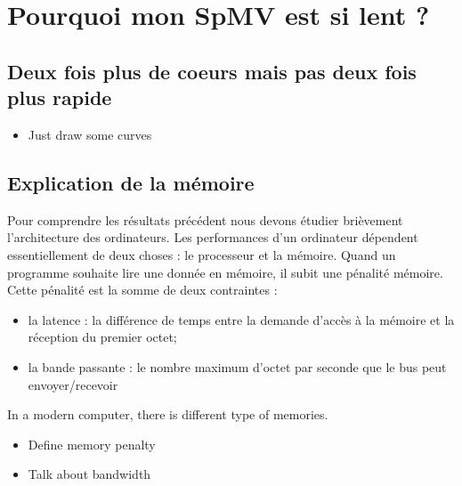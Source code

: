\section{Pourquoi mon SpMV est si lent ?}
\subsection{Deux fois plus de coeurs mais pas deux fois plus rapide}
  \begin{itemize}
    \item Just draw some curves
  \end{itemize}
\subsection{Explication de la mémoire}
Pour comprendre les résultats précédent nous devons étudier brièvement l'architecture des ordinateurs.
%
Les performances d'un ordinateur dépendent essentiellement de deux choses : le processeur et la mémoire.
%
Quand un programme souhaite lire une donnée en mémoire, il subit une pénalité mémoire.
%
Cette pénalité est la somme de deux contraintes :
\begin{itemize}
        \item la latence : la différence de temps entre la demande d'accès à la mémoire et la réception du premier octet;
        \item la bande passante : le nombre maximum d'octet par seconde que le bus peut envoyer/recevoir
\end{itemize}
%
In a modern computer, there is different type of memories.
%




  \begin{itemize}
    \item Define memory penalty
    \item Talk about bandwidth
  \end{itemize}
